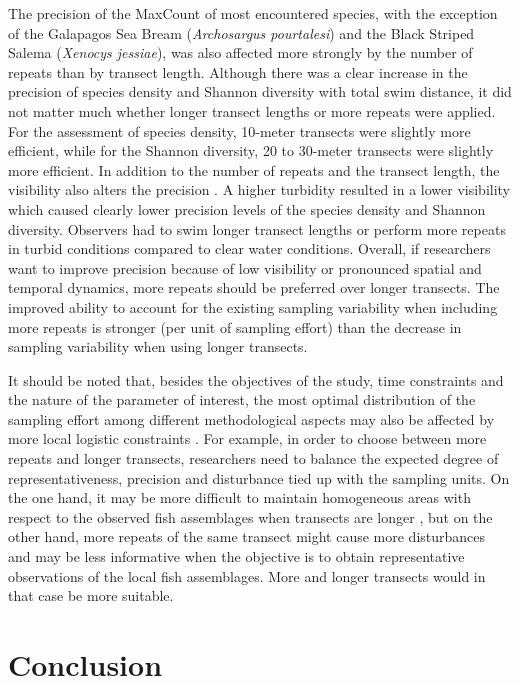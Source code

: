 \documentclass[10pt,letterpaper]{article}
\begin{document}
The precision of the MaxCount of most encountered species, with the exception of the Galapagos Sea Bream (\textit{Archosargus pourtalesi}) and the Black Striped Salema (\textit{Xenocys jessiae}), was also affected more strongly by the number of repeats than by transect length. Although there was a clear increase in the precision of species density and Shannon diversity with total swim distance, it did not matter much whether longer transect lengths or more repeats were applied. For the assessment of species density, 10-meter transects were slightly more efficient, while for the Shannon diversity, 20 to 30-meter transects were slightly more efficient. In addition to the number of repeats and the transect length, the visibility also alters the precision \cite{Figueroa-Pico2020,Bicknell2016,MacNeil2008}. A higher turbidity resulted in a lower visibility which caused clearly lower precision levels of the species density and Shannon diversity. Observers had to swim longer transect lengths or perform more repeats in turbid conditions compared to clear water conditions. Overall, if researchers want to improve precision because of low visibility or pronounced spatial and temporal dynamics, more repeats should be preferred over longer transects. The improved ability to account for the existing sampling variability when including more repeats is stronger (per unit of sampling effort) than the decrease in sampling variability when using longer transects.

It should be noted that, besides the objectives of the study, time constraints and the nature of the parameter of interest, the most optimal distribution of the sampling effort among different methodological aspects may also be affected by more local logistic constraints \cite{McCormick1987EstimatingStrip-transects}. For example, in order to choose between more repeats and longer transects, researchers need to balance the expected degree of representativeness, precision and disturbance tied up with the sampling units. On the one hand, it may be more difficult to maintain homogeneous areas with respect to the observed fish assemblages when transects are longer \cite{Anderson2015}, but on the other hand, more repeats of the same transect might cause more disturbances and may be less informative when the objective is to obtain representative observations of the local fish assemblages. More and longer transects would in that case be more suitable.

\section{Conclusion}
\end{document}
